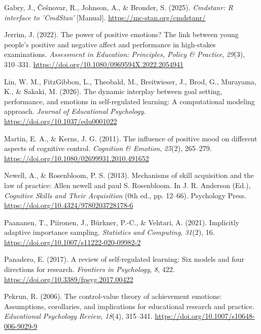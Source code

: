 \documentclass[
  man,
  floatsintext,
  longtable,
  nolmodern,
  notxfonts,
  notimes,
  colorlinks=true,linkcolor=blue,citecolor=blue,urlcolor=blue]{apa7}
\newlength{\cslhangindent}
\newenvironment{CSLReferences}[2] %
 {\begin{list}{}{%
  \setlength{\itemindent}{0pt}
  \setlength{\leftmargin}{0pt}
  \setlength{\parsep}{0pt}
  \ifodd #1
   \setlength{\leftmargin}{\cslhangindent}
   \setlength{\itemindent}{-1\cslhangindent}
  \fi
  \setlength{\itemsep}{#2\baselineskip}}}
 {\end{list}}
\begin{document}
\begin{CSLReferences}{1}{0}
Gabry, J., Češnovar, R., Johnson, A., \& Bronder, S. (2025).
\emph{Cmdstanr: {R} interface to '{CmdStan}'} {[}Manual{]}.
\url{https://mc-stan.org/cmdstanr/}

Jerrim, J. (2022). The power of positive emotions? {The} link between
young people's positive and negative affect and performance in
high-stakes examinations. \emph{Assessment in Education: Principles,
Policy \& Practice}, \emph{29}(3), 310--331.
\url{https://doi.org/10.1080/0969594X.2022.2054941}

Lin, W. M., FitzGibbon, L., Theobald, M., Breitwieser, J., Brod, G.,
Murayama, K., \& Sakaki, M. (2026). The dynamic interplay between goal
setting, performance, and emotions in self-regulated learning: {A}
computational modeling approach. \emph{Journal of Educational
Psychology}. \url{https://doi.org/10.1037/edu0001022}

Martin, E. A., \& Kerns, J. G. (2011). The influence of positive mood on
different aspects of cognitive control. \emph{Cognition \& Emotion},
\emph{25}(2), 265--279.
\url{https://doi.org/10.1080/02699931.2010.491652}

Newell, A., \& Rosenbloom, P. S. (2013). Mechanisms of skill acquisition
and the law of practice: Allen newell and paul {S}. {Rosenbloom}. In J.
R. Anderson (Ed.), \emph{Cognitive {Skills} and {Their Acquisition}}
(0th ed., pp. 12--66). Psychology Press.
\url{https://doi.org/10.4324/9780203728178-6}

Paananen, T., Piironen, J., Bürkner, P.-C., \& Vehtari, A. (2021).
Implicitly adaptive importance sampling. \emph{Statistics and
Computing}, \emph{31}(2), 16.
\url{https://doi.org/10.1007/s11222-020-09982-2}

Panadero, E. (2017). A review of self-regulated learning: Six models and
four directions for research. \emph{Frontiers in Psychology}, \emph{8},
422. \url{https://doi.org/10.3389/fpsyg.2017.00422}

Pekrun, R. (2006). The control-value theory of achievement emotions:
Assumptions, corollaries, and implications for educational research and
practice. \emph{Educational Psychology Review}, \emph{18}(4), 315--341.
\url{https://doi.org/10.1007/s10648-006-9029-9}


\end{CSLReferences}
\end{document}
